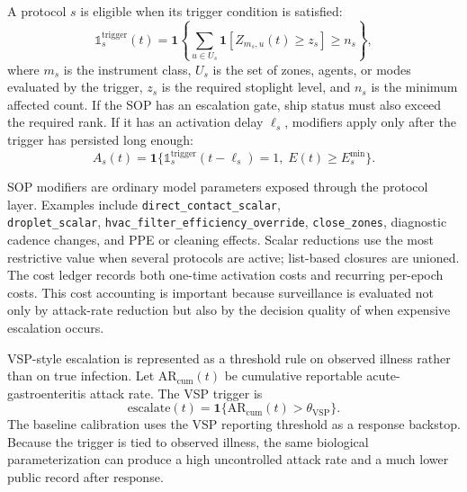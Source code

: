 A protocol $s$ is eligible when its trigger condition is satisfied:
\begin{equation}
\mathbb{1}_{s}^{\mathrm{trigger}}(t)=
\mathbf{1}\left\{\sum_{u\in U_s}\mathbf{1}\left[Z_{m_s,u}(t)\ge z_s\right]\ge n_s\right\},
\end{equation}
where $m_s$ is the instrument class, $U_s$ is the set of zones, agents, or modes evaluated by the trigger, $z_s$ is the required stoplight level, and $n_s$ is the minimum affected count. If
the SOP has an escalation gate, ship status must also exceed the required rank. If it has an activation delay $\ell_s$, modifiers apply only after the trigger has persisted long enough:
\begin{equation}
A_s(t)=\mathbf{1}\{\mathbb{1}_{s}^{\mathrm{trigger}}(t-\ell_s)=1,\;E(t)\ge E_s^{\min}\}.
\end{equation}

SOP modifiers are ordinary model parameters exposed through the protocol layer. Examples include \texttt{direct\_contact\_scalar},\\ \texttt{droplet\_scalar},
\texttt{hvac\_filter\_efficiency\_override}, \texttt{close\_zones}, diagnostic cadence changes, and PPE or cleaning effects. Scalar reductions use the most restrictive value when several
protocols are active; list-based closures are unioned. The cost ledger records both one-time activation costs and recurring per-epoch costs. This cost accounting is important because
surveillance is evaluated not only by attack-rate reduction but also by the decision quality of when expensive escalation occurs.

VSP-style escalation is represented as a threshold rule on observed illness rather than on true infection. Let $\mathrm{AR}_{\mathrm{cum}}(t)$ be cumulative reportable acute-gastroenteritis
attack rate. The VSP trigger is
\begin{equation}
\mathrm{escalate}(t)=\mathbf{1}\{\mathrm{AR}_{\mathrm{cum}}(t)>\theta_{\mathrm{VSP}}\}.
\label{eq:vsp-trigger}
\end{equation}
The baseline calibration uses the VSP reporting threshold as a response backstop. Because the trigger is tied to observed illness, the same biological parameterization can produce a high
uncontrolled attack rate and a much lower public record after response.

